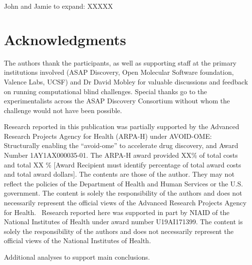 \documentclass[journal=jcim,manuscript=article]{achemso}
\begin{document}
John and Jamie to expand: XXXXX



\section{Acknowledgments}

The authors thank the participants, as well as supporting staff at the primary institutions involved (ASAP Discovery, Open Molecular Software foundation, Valence Labs, UCSF) and Dr David Mobley for valuable discussions and feedback on running computational blind challenges. Special thanks go to the experimentalists across the ASAP Discovery Consortium without whom the challenge would not have been possible. 

Research reported in this publication was partially supported by the Advanced Research Projects Agency for Health (ARPA-H) under AVOID-OME: Structurally enabling the “avoid-ome” to accelerate drug discovery, and Award Number 1AY1AX000035-01. The ARPA-H award provided XX\% of total costs and total XX \% [Award Recipient must identify percentage of total award costs and total award dollars]. The contents are those of the author. They may not reflect the policies of the Department of Health and Human Services or the U.S. government. The content is solely the responsibility of the authors and does not necessarily represent the official views of the Advanced Research Projects Agency for Health.\
Research reported here was supported in part by NIAID of the National Institutes of Health under award number U19AI171399.
The content is solely the responsibility of the authors and does not necessarily represent the official views of the National Institutes of Health.


\begin{suppinfo}

Additional analyses to support main conclusions. 

\end{suppinfo}


\end{document}
